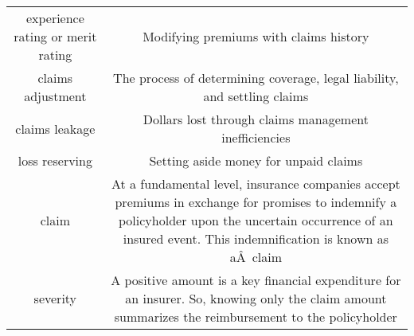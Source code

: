 \documentclass[]{book}
\theoremstyle{definition}
\theoremstyle{definition}
\theoremstyle{definition}
\theoremstyle{remark}
\begin{document}
\begin{longtable}[]{@{}cc@{}}
\begin{minipage}[t]{0.41\columnwidth}\centering\strut
experience rating or merit rating\strut
\end{minipage} & \begin{minipage}[t]{0.42\columnwidth}\centering\strut
Modifying premiums with claims history\strut
\end{minipage}\tabularnewline
\begin{minipage}[t]{0.41\columnwidth}\centering\strut
claims adjustment\strut
\end{minipage} & \begin{minipage}[t]{0.42\columnwidth}\centering\strut
The process of determining coverage, legal liability, and settling
claims\strut
\end{minipage}\tabularnewline
\begin{minipage}[t]{0.41\columnwidth}\centering\strut
claims leakage\strut
\end{minipage} & \begin{minipage}[t]{0.42\columnwidth}\centering\strut
Dollars lost through claims management inefficiencies\strut
\end{minipage}\tabularnewline
\begin{minipage}[t]{0.41\columnwidth}\centering\strut
loss reserving\strut
\end{minipage} & \begin{minipage}[t]{0.42\columnwidth}\centering\strut
Setting aside money for unpaid claims\strut
\end{minipage}\tabularnewline
\begin{minipage}[t]{0.41\columnwidth}\centering\strut
claim\strut
\end{minipage} & \begin{minipage}[t]{0.42\columnwidth}\centering\strut
At a fundamental level, insurance companies accept premiums in exchange
for promises to indemnify a policyholder upon the uncertain occurrence
of an insured event. This indemnification is known as aÂ~claim\strut
\end{minipage}\tabularnewline
\begin{minipage}[t]{0.41\columnwidth}\centering\strut
severity\strut
\end{minipage} & \begin{minipage}[t]{0.42\columnwidth}\centering\strut
A positive amount is a key financial expenditure for an insurer. So,
knowing only the claim amount summarizes the reimbursement to the
policyholder\strut
\end{minipage}\tabularnewline

\end{longtable}
\end{document}
